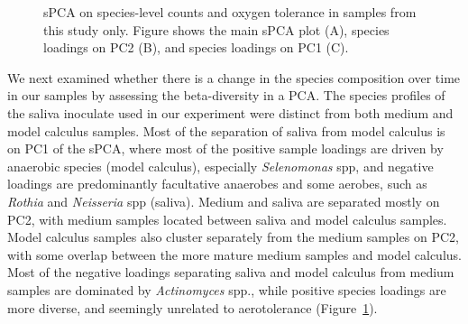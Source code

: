 \documentclass[
  b5paper,
]{book}
\begin{document}
\begin{figure}


\caption{\label{fig-spca-byoc}sPCA on species-level counts and oxygen
tolerance in samples from this study only. Figure shows the main sPCA
plot (A), species loadings on PC2 (B), and species loadings on PC1 (C).}

\end{figure}%

We next examined whether there is a change in the species composition
over time in our samples by assessing the beta-diversity in a PCA. The
species profiles of the saliva inoculate used in our experiment were
distinct from both medium and model calculus samples. Most of the
separation of saliva from model calculus is on PC1 of the sPCA, where
most of the positive sample loadings are driven by anaerobic species
(model calculus), especially \emph{Selenomonas} spp, and negative
loadings are predominantly facultative anaerobes and some aerobes, such
as \emph{Rothia} and \emph{Neisseria} spp (saliva). Medium and saliva
are separated mostly on PC2, with medium samples located between saliva
and model calculus samples. Model calculus samples also cluster
separately from the medium samples on PC2, with some overlap between the
more mature medium samples and model calculus. Most of the negative
loadings separating saliva and model calculus from medium samples are
dominated by \emph{Actinomyces} spp., while positive species loadings
are more diverse, and seemingly unrelated to aerotolerance
(Figure~\ref{fig-spca-byoc}).
\end{document}
